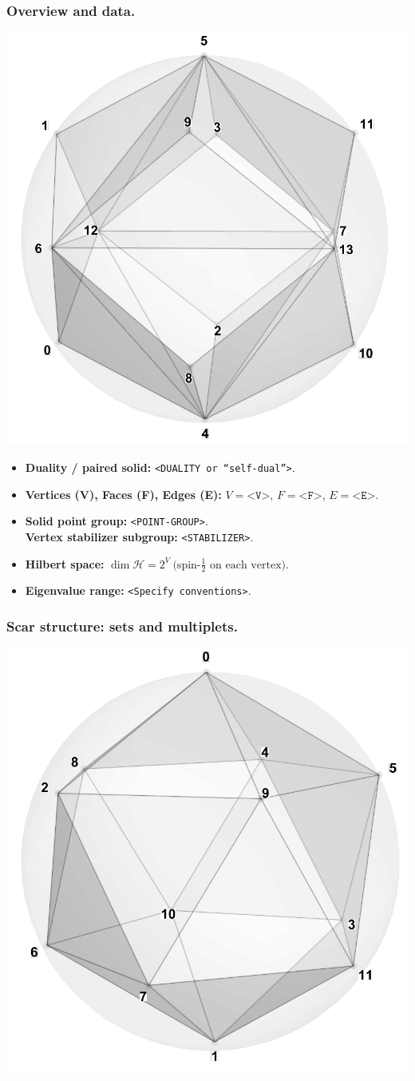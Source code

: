 \documentclass[11pt,a4paper]{article}
\begin{document}
\subsubsection*{Overview and data.}
\begin{center}
  \includegraphics[width=.6\linewidth]{triakisoctahedron}
\end{center}

\begin{itemize}[leftmargin=1.5em]
  \item \textbf{Duality / paired solid:} \texttt{<DUALITY or “self-dual”>}.
  \item \textbf{Vertices (V), Faces (F), Edges (E):} $V=\texttt{<V>}$,\; $F=\texttt{<F>}$,\; $E=\texttt{<E>}$.
  \item \textbf{Solid point group:} \texttt{<POINT-GROUP>}.\\
        \textbf{Vertex stabilizer subgroup:} \texttt{<STABILIZER>}.
  \item \textbf{Hilbert space:} \(
        \dim\mathcal{H} = 2^{V}\ \text{(spin-$\tfrac12$ on each vertex).}
        \)
  \item \textbf{Eigenvalue range:} \texttt{<Specify conventions>}.
\end{itemize}

\subsubsection*{Scar structure: sets and multiplets.}
\begin{center}
  \includegraphics[width=.6\linewidth]{icosahedron}
\end{center}
\end{document}

